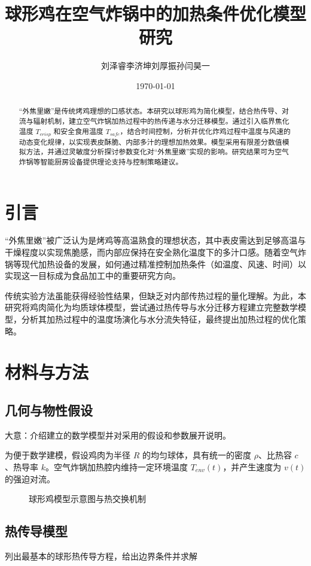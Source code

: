 \documentclass[12pt]{article}
\title{球形鸡在空气炸锅中的加热条件优化模型研究}
\author{刘泽睿\quad 李济坤\quad 刘厚振\quad 孙闫昊一}
\date{\today}
\begin{document}
\maketitle

\begin{abstract}
“外焦里嫩”是传统烤鸡理想的口感状态。本研究以球形鸡为简化模型，结合热传导、对流与辐射机制，建立空气炸锅加热过程中的热传递与水分迁移模型。通过引入临界焦化温度 $T_{crisp}$ 和安全食用温度 $T_{safe}$，结合时间控制，分析并优化炸鸡过程中温度与风速的动态变化规律，以实现表皮酥脆、内部多汁的理想加热效果。模型采用有限差分数值模拟方法，并通过灵敏度分析探讨参数变化对“外焦里嫩”实现的影响。研究结果可为空气炸锅等智能厨房设备提供理论支持与控制策略建议。
\end{abstract}

\section{引言}
“外焦里嫩”被广泛认为是烤鸡等高温熟食的理想状态，其中表皮需达到足够高温与干燥程度以实现焦脆感，而内部应保持在安全熟化温度下的多汁口感。随着空气炸锅等现代加热设备的发展，如何通过精准控制加热条件（如温度、风速、时间）以实现这一目标成为食品加工中的重要研究方向。

传统实验方法虽能获得经验性结果，但缺乏对内部传热过程的量化理解。为此，本研究将鸡肉简化为均质球体模型，尝试通过热传导与水分迁移方程建立完整数学模型，分析其加热过程中的温度场演化与水分流失特征，最终提出加热过程的优化策略\cite{Incropera,Moisture,Quality}。

\section{材料与方法}

\subsection{几何与物性假设}
大意：介绍建立的数学模型并对采用的假设和参数展开说明。 
\par 为便于数学建模，假设鸡肉为半径 $R$ 的均匀球体，具有统一的密度 $\rho$、比热容 $c$、热导率 $k$。空气炸锅加热腔内维持一定环境温度 $T_{env}(t)$，并产生速度为 $v(t)$ 的强迫对流。


\begin{figure}[htbp]
\centering
\caption{球形鸡模型示意图与热交换机制}
\label{fig:model}
\end{figure}

\subsection{热传导模型}
列出最基本的球形热传导方程，给出边界条件并求解
\end{document}
